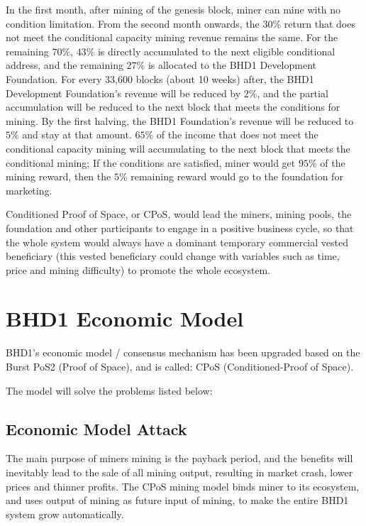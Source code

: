 \begin{flushleft}
    In the first month, after mining of the genesis block, miner can mine with no condition limitation. From the second month onwards, the $30\%$ return that does not meet the conditional capacity mining revenue remains the same. For the remaining $70\%$, $43\%$ is directly accumulated to the next eligible conditional address, and the remaining $27\%$ is allocated to the BHD1 Development Foundation. For every 33,600 blocks (about 10 weeks) after, the BHD1 Development Foundation's revenue will be reduced by $2\%$, and the partial accumulation will be reduced to the next block that meets the conditions for mining. By the first halving, the BHD1 Foundation's revenue will be reduced to $5\%$ and stay at that amount. $65\%$ of the income that does not meet the conditional capacity mining will accumulating to the next block that meets the conditional mining; If the conditions are satisfied, miner would get $95\%$ of the mining reward, then the $5\%$ remaining reward would go to the foundation for marketing.
\end{flushleft}
\begin{flushleft}
    Conditioned Proof of Space, or CPoS, would lead the miners, mining pools, the foundation and other participants to engage in a positive business cycle, so that the whole system would always have a dominant temporary commercial vested beneficiary (this vested beneficiary could change with variables such as time, price and mining difficulty) to promote the whole ecosystem.
\end{flushleft}
\section{BHD1 Economic Model}
\begin{flushleft}
    BHD1's economic model / consensus mechanism has been upgraded based on the Burst PoS2 (Proof of Space), and is called: CPoS (Conditioned-Proof of Space).
\end{flushleft}
\begin{flushleft}
    The model will solve the problems listed below:
\end{flushleft}
\subsection{Economic Model Attack}
\begin{flushleft}
    The main purpose of miners mining is the payback period, and the benefits will inevitably lead to the sale of all mining output, resulting in market crash, lower prices and thinner profits. The CPoS mining model binds miner to its ecosystem, and uses output of mining as future input of mining, to make the entire BHD1 system grow automatically.
\end{flushleft}
